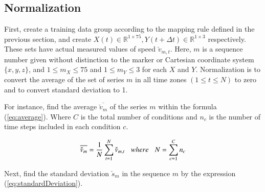 \documentclass{sigchi}
\begin{document}
\subsection{Normalization}


First, create a training data group according to the mapping rule defined in the previous section, and create $ X (t) \in \mathbb {R} ^ {1 \times 75}, Y (t + \Delta t) \in \mathbb {R} ^ {1 \times 3} $ respectively. These sets have actual measured values of speed $ \check {v}_{m, t} $. Here, $ m $ is a sequence number given without distinction to the marker or Cartesian coordinate system $ \{x, y, z \} $, and $ 1 \leq m_X \leq 75$ and $ 1 \leq m_Y \leq 3 $ for each $ X $ and $ Y $. Normalization is to convert the average of the set of series $ m $ in all time zones $ (1 \leq t \leq N) $ to zero and to convert standard deviation to 1.

For instance, find the average $ \overline {\check {v}_{m}} $ of the series $ m $ within the formula (\ref{eq:average}). Where $ C $ is the total number of conditions and $ n_c $ is the number of time steps included in each condition $ c $.

\begin{equation}
\overline{\check{v}_{m}} = \frac{1}{N}\sum^{N}_{t=1}\check{v}_{m,t} 
 \hspace{3mm} where  \hspace{3mm}
N=\sum^{C}_{c=1} n_c 
\label{eq:average}
\end{equation}

Next, find the standard deviation $ \check {s}_m $ in the sequence $ m $ by the expression (\ref{eq:standardDeviation}).
\end{document}

